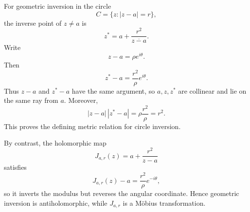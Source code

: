 \begin{solution}
For geometric inversion in the circle
\[
C=\{z:|z-a|=r\},
\]
the inverse point of \(z\neq a\) is
\[
z^*
=
a+\frac{r^2}{\overline{z-a}}.
\]
Write
\[
z-a=\rho e^{i\theta}.
\]
Then
\[
z^*-a
=
\frac{r^2}{\rho}e^{i\theta}.
\]
Thus \(z-a\) and \(z^*-a\) have the same argument, so \(a,z,z^*\) are collinear and lie on the same ray from \(a\). Moreover,
\[
|z-a|\,|z^*-a|
=
\rho\frac{r^2}{\rho}
=
r^2.
\]
This proves the defining metric relation for circle inversion.

By contrast, the holomorphic map
\[
J_{a,r}(z)=a+\frac{r^2}{z-a}
\]
satisfies
\[
J_{a,r}(z)-a=\frac{r^2}{\rho}e^{-i\theta},
\]
so it inverts the modulus but reverses the angular coordinate. Hence geometric inversion is antiholomorphic, while \(J_{a,r}\) is a M\"obius transformation.
\end{solution}


